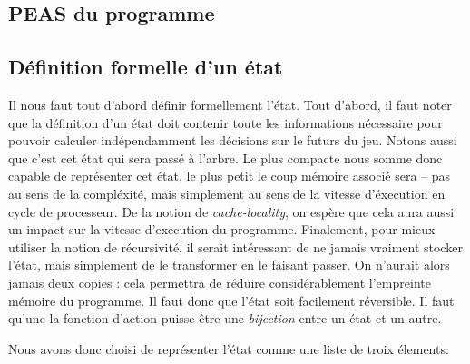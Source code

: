 \documentclass[a4paper,11pt]{article}
\begin{document}
\begin{multicols}{2}[]
  \subsection{PEAS du programme}

  \subsection{Définition formelle d'un état}

    Il nous faut tout d'abord définir formellement l'état. Tout d'abord, il
    faut noter que la définition d'un état doit contenir toute les informations
    nécessaire pour pouvoir calculer indépendamment les décisions sur le futurs
    du jeu. Notons aussi que c'est cet état qui sera passé à l'arbre. Le plus
    compacte nous somme donc capable de représenter cet état, le plus petit le
    coup mémoire associé sera -- pas au sens de la compléxité, mais simplement
    au sens de la vitesse d'éxecution en cycle de processeur. De la notion de
    \emph{cache-locality}, on espère que cela aura aussi un impact sur la
    vitesse d'execution du programme. Finalement, pour mieux utiliser la notion
    de récursivité, il serait intéressant de ne jamais vraiment stocker l'état,
    mais simplement de le transformer en le faisant passer. On n'aurait alors
    jamais deux copies : cela permettra de réduire considérablement l'empreinte
    mémoire du programme. Il faut donc que l'état soit facilement réversible.
    Il faut qu'une la fonction d'action puisse être une \emph{bijection} entre
    un état et un autre.

    Nous avons donc choisi de représenter l'état comme une liste de troix
    élements:


\end{multicols}
\end{document}
